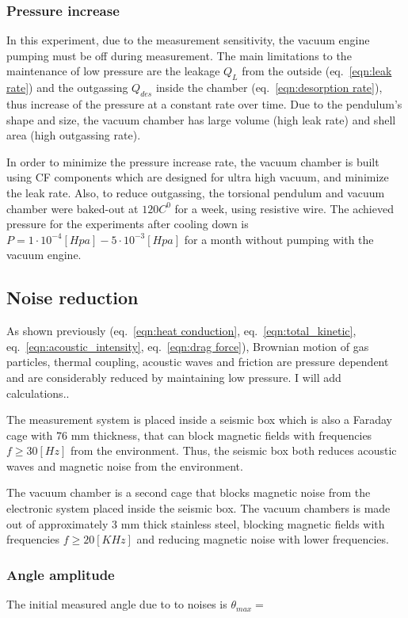 \documentclass[\main/master.tex]{subfiles}
\begin{document}
\subsubsection{Pressure increase}
\par\noindent
In this experiment, due to the measurement sensitivity, the vacuum engine pumping must be off during measurement. The main limitations to the maintenance of low pressure are the leakage $Q_L$ from the outside (eq.~\ref{eqn:leak rate}) and the outgassing $Q_{des}$ inside the chamber (eq.~\ref{eqn:desorption rate}), thus increase of the pressure at a constant rate over time. Due to the pendulum's shape and size, the vacuum chamber has large volume (high leak rate) and shell area (high outgassing rate).
\par\noindent
In order to minimize the pressure increase rate, the vacuum chamber is built using CF components which are designed for ultra high vacuum, and minimize the leak rate. Also, to reduce outgassing, the torsional pendulum and vacuum chamber were baked-out at $120 C^0$ for a week, using resistive wire. The achieved pressure for the experiments after cooling down is $P=1\cdot 10^{−4} [Hpa] - 5\cdot 10^{−3} [Hpa]$ for a month without pumping with the vacuum engine.

\subsection{Noise reduction}
As shown previously (eq.~\ref{eqn:heat conduction}, eq.~\ref{eqn:total_kinetic}, eq.~\ref{eqn:acoustic_intensity}, eq.~\ref{eqn:drag force}), Brownian motion of gas particles, thermal coupling, acoustic waves and friction are pressure dependent and are considerably reduced by maintaining low pressure.
I will add calculations..
\par\noindent
The measurement system is placed inside a seismic box which is also a Faraday cage with 76 mm thickness, that can block magnetic fields with frequencies $f \ge 30 [Hz]$ from the environment. Thus, the seismic box both reduces acoustic waves and magnetic noise from the environment.
\par\noindent
The vacuum chamber is a second cage that blocks magnetic noise from the electronic system placed inside the seismic box. The vacuum chambers is made out of approximately 3 mm thick stainless steel, blocking magnetic fields with frequencies $f\ge 20 [KHz]$ and reducing magnetic noise with lower frequencies.
\par\noindent
\subsubsection{Angle amplitude}
The initial measured angle due to to noises is $\theta_{max} = $
\end{document}
